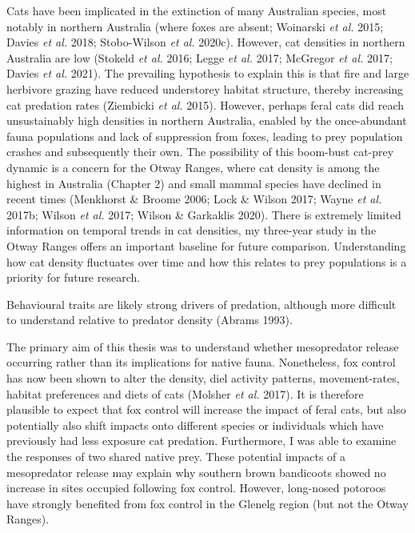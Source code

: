 \documentclass[11pt,a4paper,titlepage,twoside,openright]{style/unimelbthesis}
\begin{document}
\begin{mainmatter}
Cats have been implicated in the extinction of many Australian species, most notably in northern Australia (where foxes are absent; Woinarski \emph{et al.} 2015; Davies \emph{et al.} 2018; Stobo-Wilson \emph{et al.} 2020c). However, cat densities in northern Australia are low (Stokeld \emph{et al.} 2016; Legge \emph{et al.} 2017; McGregor \emph{et al.} 2017; Davies \emph{et al.} 2021). The prevailing hypothesis to explain this is that fire and large herbivore grazing have reduced understorey habitat structure, thereby increasing cat predation rates (Ziembicki \emph{et al.} 2015). However, perhaps feral cats did reach unsustainably high densities in northern Australia, enabled by the once-abundant fauna populations and lack of suppression from foxes, leading to prey population crashes and subsequently their own. The possibility of this boom-bust cat-prey dynamic is a concern for the Otway Ranges, where cat density is among the highest in Australia (Chapter 2) and small mammal species have declined in recent times (Menkhorst \& Broome 2006; Lock \& Wilson 2017; Wayne \emph{et al.} 2017b; Wilson \emph{et al.} 2017; Wilson \& Garkaklis 2020). There is extremely limited information on temporal trends in cat densities, my three-year study in the Otway Ranges offers an important baseline for future comparison. Understanding how cat density fluctuates over time and how this relates to prey populations is a priority for future research.

Behavioural traits are likely strong drivers of predation, although more difficult to understand relative to predator density (Abrams 1993).

The primary aim of this thesis was to understand whether mesopredator release occurring rather than its implications for native fauna. Nonetheless, fox control has now been shown to alter the density, diel activity patterns, movement-rates, habitat preferences and diets of cats (Molsher \emph{et al.} 2017). It is therefore plausible to expect that fox control will increase the impact of feral cats, but also potentially also shift impacts onto different species or individuals which have previously had less exposure cat predation. Furthermore, I was able to examine the responses of two shared native prey. These potential impacts of a mesopredator release may explain why southern brown bandicoots showed no increase in sites occupied following fox control. However, long-nosed potoroos have strongly benefited from fox control in the Glenelg region (but not the Otway Ranges).


\end{mainmatter}
\end{document}
